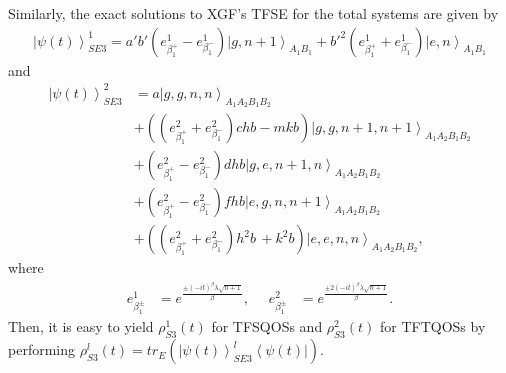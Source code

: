 \documentclass[
showpacs,  %
showkeys,  %
aps,       %
amsthm,    %
amsmath,   %
amsfonts,  %
amssymb    %
]{revtex4-1}          %
\begin{document}
Similarly, the exact solutions to XGF's TFSE for the total systems are given by
\begin{equation}
\label{e27}
\begin{aligned}
{\left|{\psi(t)} \right\rangle_{SE3}^{1}}=a'b'({e_{\beta_1^ + }^1}-{e_{\beta_1^ - }^1}){\left| {g,n + 1} \right\rangle_{{A_1}{B_1}}}+{{b'}^2}({e_{\beta_1^ + }^1}+{e_{\beta_1^ - }^1}){\left|{e,n} \right\rangle_{{A_1}{B_1}}}
\end{aligned}
\end{equation}
and
\begin{equation}
\label{e28}
\begin{aligned}
{\left|{\psi(t)} \right\rangle_{SE3}^{2}} &= a{\left| {g,g,n,n} \right\rangle_{{A_1}{A_2}{B_1}{B_2}}}\\
&+(({e_{\beta_1^ + }^2}+{e_{\beta_1^ - }^2})chb - mkb){\left| {g,g,n + 1,n + 1} \right\rangle _{{A_1}{A_2}{B_1}{B_2}}}\\
&+ ({e_{\beta_1^ + }^2}-{e_{\beta_1^ - }^2})dhb{\left| {g,e,n + 1,n} \right\rangle _{{A_1}{A_2}{B_1}{B_2}}}\\
&+ ({e_{\beta_1^ + }^2}-{e_{\beta_1^ - }^2})fhb{\left| {e,g,n,n + 1} \right\rangle _{{A_1}{A_2}{B_1}{B_2}}}\,\\
&+ (({e_{\beta_1^ + }^2}+{e_{\beta_1^ - }^2}){h^2}b\, + {k^2}b){\left| {e,e,n,n} \right\rangle _{{A_1}{A_2}{B_1}{B_2}}},
\end{aligned}
\end{equation}
where
\begin{equation}
\label{e29}
\begin{aligned}
e_{\beta_1^\pm}^1 &= {e^{\frac{{\pm{{(-it)}^\beta}\lambda \sqrt {n + 1} }}{\beta}}},\,\,\,\,\,\,\,\,
e_{\beta_1^\pm}^2 &= {e^{\frac{{\pm2{{(-it)}^\beta}\lambda \sqrt {n + 1} }}{\beta}}}.
\end{aligned}
\end{equation}
Then, it is easy to yield ${\rho_{S3}^{1}(t)}$ for TFSQOSs and ${\rho_{S3}^{2}(t)}$ for TFTQOSs by performing ${\rho_{S3}^{l}(t)} = t{r_E}({\left| {\psi (t)} \right\rangle _{SE3}^{l}}\left\langle {\psi (t)} \right|)$.
\end{document}
